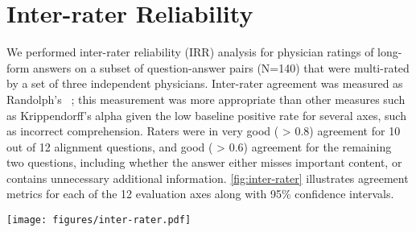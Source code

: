 \section{Inter-rater Reliability}
\label{sec-sup:inter-rater-reliability}
We performed inter-rater reliability (IRR) analysis for physician ratings of long-form answers on a subset of question-answer pairs (N=140) that were multi-rated by a set of three independent physicians. Inter-rater agreement was measured as Randolph's  ~\cite{randolph2005free}; this measurement was more appropriate than other measures such as Krippendorff's alpha given the low baseline positive rate for several axes, such as incorrect comprehension. Raters were in very good ( > 0.8) agreement for 10 out of 12 alignment questions, and good ( > 0.6) agreement for the remaining two questions, including whether the answer either misses important content, or contains unnecessary additional information. \cref{fig:inter-rater} illustrates agreement metrics for each of the 12 evaluation axes along with 95\% confidence intervals. 

\begin{figure*}[h]
\small
    \centering
    \texttt{[image: figures/inter-rater.pdf]}
    \vspace{10pt}
    \caption{\textbf{Inter-rater reliability} Illustration of inter-rater reliability for the 12 alignment questions on MultiMedQA 140. The green dotted line (=0.6) indicates good agreement and the green solid line (=0.8) indicates very good agreement. }
    \vspace{-0pt}
    \label{fig:inter-rater}
\end{figure*}


